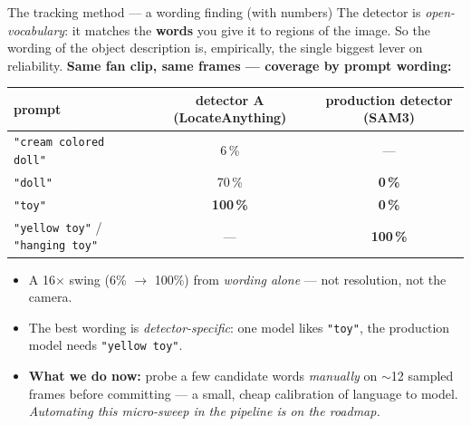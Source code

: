 \documentclass[aspectratio=169,10pt]{beamer}
\newcommand{\hl}[1]{{\bfseries\color{cAccent}#1}}
\begin{document}
\begin{frame}{The tracking method --- a wording finding (with numbers)}
\small
The detector is \emph{open-vocabulary}: it matches the \textbf{words} you give it to regions of the image.
So the wording of the object description is, empirically, the single biggest lever on reliability.
\vspace{0.4em}
\centering
{\footnotesize \textbf{Same fan clip, same frames --- coverage by prompt wording:}}\\[2pt]
\begin{tabular}{@{}lcc@{}}
\toprule
prompt & detector A (LocateAnything) & production detector (SAM3)\\
\midrule
\texttt{"cream colored doll"} & 6\,\% & ---\\
\texttt{"doll"} & 70\,\% & \hl{0\,\%}\\
\texttt{"toy"} & \hl{100\,\%} & \hl{0\,\%}\\
\texttt{"yellow toy"} / \texttt{"hanging toy"} & --- & \hl{100\,\%}\\
\bottomrule
\end{tabular}
\vspace{0.5em}
\flushleft
\begin{itemize}\setlength\itemsep{2pt}\footnotesize
  \item A \alert{16$\times$} swing (6\% $\to$ 100\%) from \emph{wording alone} --- not resolution, not the camera.
  \item The best wording is \emph{detector-specific}: one model likes \texttt{"toy"}, the production model needs \texttt{"yellow toy"}.
  \item \textbf{What we do now:} probe a few candidate words \emph{manually} on $\sim$12 sampled frames before committing --- a small, cheap calibration of language to model. \emph{Automating this micro-sweep in the pipeline is on the roadmap.}
\end{itemize}
\end{frame}
\end{document}
